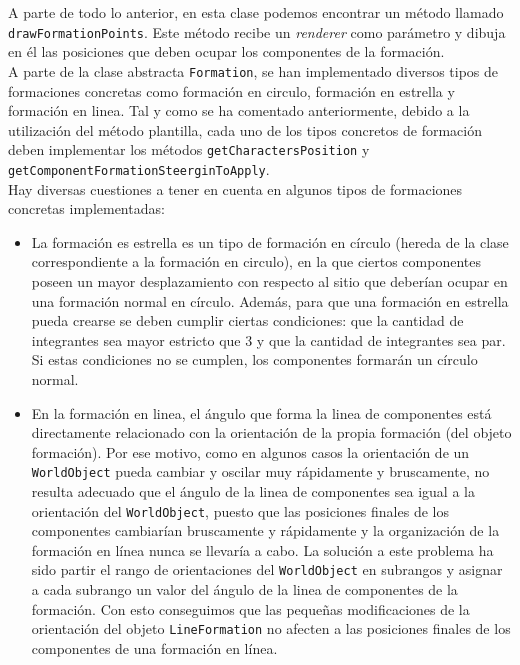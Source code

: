 A parte de todo lo anterior, en esta clase podemos encontrar un método llamado \texttt{drawFormationPoints}. Este método recibe un \textit{renderer} como parámetro y dibuja en él las posiciones que deben ocupar los componentes de la formación. \\

A parte de la clase abstracta \texttt{Formation}, se han implementado diversos tipos de formaciones concretas como formación en circulo, formación en estrella y formación en linea. Tal y como se ha comentado anteriormente, debido a la utilización del método plantilla, cada uno de los tipos concretos de formación deben implementar los métodos \texttt{getCharactersPosition} y \texttt{getComponentFormationSteerginToApply}. \\

Hay diversas cuestiones a tener en cuenta en algunos tipos de formaciones concretas implementadas:
\begin{itemize}
	\item La formación es estrella es un tipo de formación en círculo (hereda de la clase correspondiente a la formación en circulo), en la que ciertos componentes poseen un mayor desplazamiento con respecto al sitio que deberían ocupar en una formación normal en círculo. Además, para que una formación en estrella pueda crearse se deben cumplir ciertas condiciones: que la cantidad de integrantes sea mayor estricto que 3 y que la cantidad de integrantes sea par. Si estas condiciones no se cumplen, los componentes formarán un círculo normal.
	\item En la formación en linea, el ángulo que forma la linea de componentes está directamente relacionado con la orientación de la propia formación (del objeto formación). Por ese motivo, como en algunos casos la orientación de un \texttt{WorldObject} pueda cambiar y oscilar muy rápidamente y bruscamente, no resulta adecuado que el ángulo de la linea de componentes sea igual a la orientación del \texttt{WorldObject}, puesto que las posiciones finales de los componentes cambiarían bruscamente y rápidamente y la organización de la formación en línea nunca se llevaría a cabo. La solución a este problema ha sido partir el rango de orientaciones del \texttt{WorldObject} en subrangos y asignar a cada subrango un valor del ángulo de la linea de componentes de la formación. Con esto conseguimos que las pequeñas modificaciones de la orientación del objeto \texttt{LineFormation} no afecten a las posiciones finales de los componentes de una formación en línea.
\end{itemize}

